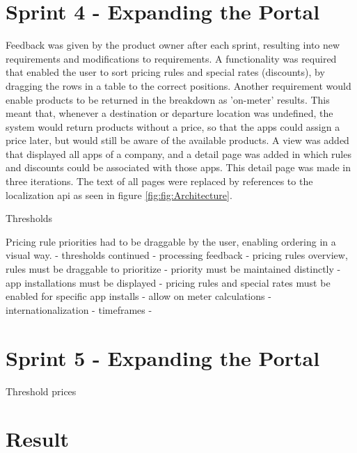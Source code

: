 %
\section{Sprint 4 - Expanding the Portal}
Feedback was given by the product owner after each sprint, resulting into new requirements and modifications to requirements. A functionality was required that enabled the user to sort pricing rules and special rates (discounts), by dragging the rows in a table to the correct positions. Another requirement would enable products to be returned in the breakdown as 'on-meter' results. This meant that, whenever a destination or departure location was undefined, the system would return products without a price, so that the apps could assign a price later, but would still be aware of the available products.
A view was added that displayed all apps of a company, and a detail page was added in which rules and discounts could be associated with those apps. This detail page was made in three iterations. The text of all pages were replaced by references to the localization api as seen in figure \ref{fig:fig:Architecture}.

Thresholds

Pricing rule priorities had to be draggable by the user, enabling ordering in a visual way.
- thresholds continued
- processing feedback
- pricing rules overview, rules must be draggable to prioritize
- priority must be maintained distinctly
- app installations must be displayed
- pricing rules and special rates must be enabled for specific app installs
- allow on meter calculations
- internationalization
- timeframes
-

%
\section{Sprint 5 - Expanding the Portal}
Threshold prices

%
\section{Result}